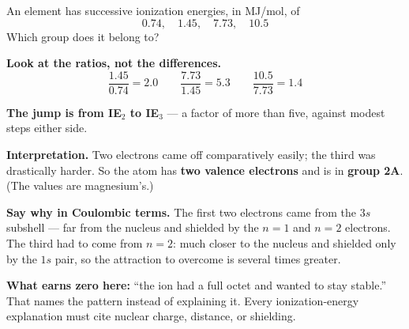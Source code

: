 \documentclass{apchem-worksheet}
\begin{document}
\begin{workedexample}
An element has successive ionization energies, in MJ/mol, of
\[ 0.74,\quad 1.45,\quad 7.73,\quad 10.5 \]
Which group does it belong to?

\textbf{Look at the ratios, not the differences.}
\[ \frac{1.45}{0.74} = 2.0 \qquad
   \frac{7.73}{1.45} = 5.3 \qquad
   \frac{10.5}{7.73} = 1.4 \]

\textbf{The jump is from IE$_2$ to IE$_3$} --- a factor of more than
five, against modest steps either side.

\textbf{Interpretation.} Two electrons came off comparatively easily;
the third was drastically harder. So the atom has \textbf{two valence
electrons} and is in \textbf{group 2A}. (The values are magnesium's.)

\textbf{Say why in Coulombic terms.} The first two electrons came from
the $3s$ subshell --- far from the nucleus and shielded by the $n = 1$
and $n = 2$ electrons. The third had to come from $n = 2$: much closer
to the nucleus and shielded only by the $1s$ pair, so the attraction to
overcome is several times greater.

\textbf{What earns zero here:} ``the ion had a full octet and wanted to
stay stable.'' That names the pattern instead of explaining it. Every
ionization-energy explanation must cite nuclear charge, distance, or
shielding.
\end{workedexample}
\end{document}

